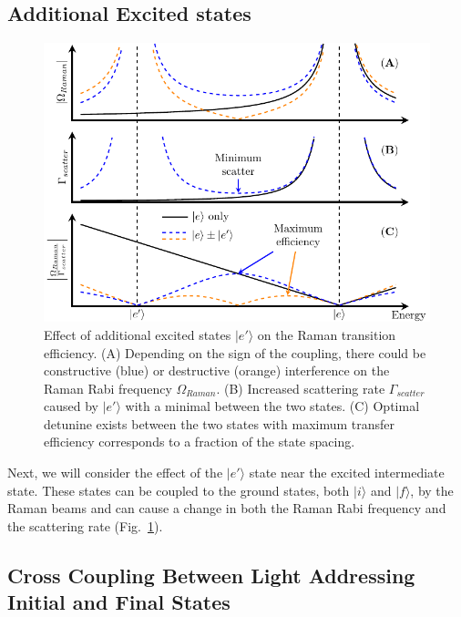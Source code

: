 \subsection{Additional Excited states}

\begin{figure}
  \centering
  \includegraphics[width=\textwidth]{figures/raman_transfer_extra_ext_states.pdf}
  \caption[Raman transition with additional excited states]{
    Effect of additional excited states $|e'\rangle$ on the Raman transition efficiency.
    (A) Depending on the sign of the coupling, there could be constructive (blue)
    or destructive (orange) interference on the Raman Rabi frequency $\Omega_{Raman}$.
    (B) Increased scattering rate $\Gamma_{scatter}$ caused by $|e'\rangle$ with a minimal
    between the two states.
    (C) Optimal detunine exists between the two states with maximum transfer efficiency
    corresponds to a fraction of the state spacing.
    \label{fig:raman-transfer-extra-ext-states}}
\end{figure}

Next, we will consider the effect of the $|e'\rangle$ state near the excited intermediate state.
These states can be coupled to the ground states, both $|i\rangle$ and $|f\rangle$,
by the Raman beams and can cause a change in both the Raman Rabi frequency
and the scattering rate (Fig.~\ref{fig:raman-transfer-extra-ext-states}).

\subsection{Cross Coupling Between Light Addressing Initial and Final States}

